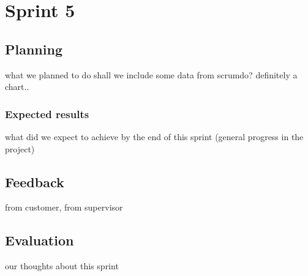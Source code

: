 
\chapter{Sprint 5} %

\label{Sprint 5} %


\section{Planning}
what we planned to do
shall we include some data from scrumdo? definitely a chart..
\subsection{Expected results}
what did we expect to achieve by the end of this sprint (general progress in the project)
\section{Feedback}
from customer, from supervisor
\section{Evaluation}
our thoughts about this sprint